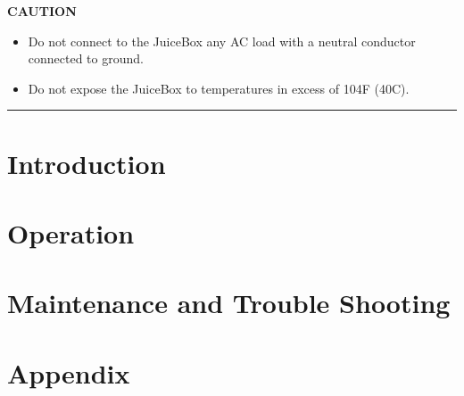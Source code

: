\documentclass[10pt]{article}
\begin{document}
\vspace{5mm}
\noindent   
\Large{\textbf{CAUTION}} \\
\begin{large}                                        
	\begin{itemize}
		\item{Do not connect to the JuiceBox any AC load with a neutral conductor connected to ground.}
		\item{Do not expose the JuiceBox to temperatures in excess of 104F (40C).}
	\end{itemize}
\end{large}
\hrule


\newpage
\tableofcontents

\newpage
{} 					%
\setcounter{page}{1} 					%

\newpage
\section{\huge{Introduction}}

 
\newpage
\section{\huge{Operation}}


\newpage
\section{\huge{Maintenance and Trouble Shooting}}



\newpage
\section{\huge{Appendix}}

\end{document}
